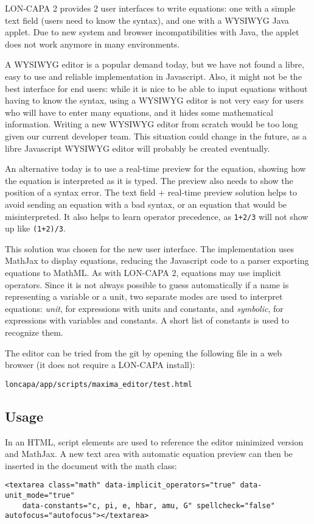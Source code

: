 LON-CAPA 2 provides 2 user interfaces to write equations: one with a simple text field
(users need to know the syntax), and one with a WYSIWYG Java applet. Due to new system
and browser incompatibilities with Java, the applet does not work anymore in many environments.

A WYSIWYG editor is a popular demand today, but we have not found a libre, easy to use and reliable
implementation in Javascript. Also, it might not be the best interface for end users: while it is
nice to be able to input equations without having to know the syntax, using a WYSIWYG editor
is not very easy for users who will have to enter many equations, and it hides some mathematical information.
Writing a new WYSIWYG editor from scratch would be too long given our current developer team.
This situation could change in the future, as a libre Javascript WYSIWYG editor will probably be
created eventually.

An alternative today is to use a real-time preview for the equation, showing how the equation is interpreted
as it is typed. The preview also needs to show the position of a syntax error.
The text field + real-time preview solution helps to avoid sending an equation with a bad syntax, or
an equation that would be misinterpreted. It also helps to learn operator precedence,
as \texttt{1+2/3} will not show up like \texttt{(1+2)/3}.

This solution was chosen for the new user interface. The implementation uses MathJax to display
equations, reducing the Javascript code to a parser exporting equations to MathML.
As with LON-CAPA 2, equations may use implicit operators. Since it is not always possible to
guess automatically if a name is representing a variable or a unit, two separate modes
are used to interpret equations: \textit{unit}, for expressions with units and constants,
and \textit{symbolic}, for expressions with variables and constants.
A short list of constants is used to recognize them.

The editor can be tried from the git by opening the following file in a web browser
(it does not require a LON-CAPA install):
\begin{verbatim}
loncapa/app/scripts/maxima_editor/test.html
\end{verbatim}

\subsection{Usage}
In an HTML, script elements are used to reference the editor minimized version and MathJax.
A new text area with automatic equation preview can then be inserted in the document with the math class:
\begin{verbatim}
<textarea class="math" data-implicit_operators="true" data-unit_mode="true"
    data-constants="c, pi, e, hbar, amu, G" spellcheck="false" autofocus="autofocus"></textarea>
\end{verbatim}


